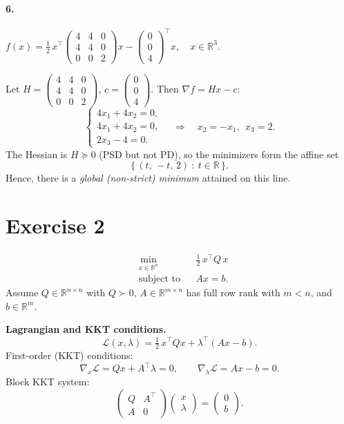 \documentclass{article}
\begin{document}
\paragraph{6.} \(f(x)=\tfrac12\,x^\top\!
\begin{pmatrix}
4&4&0\\
4&4&0\\
0&0&2
\end{pmatrix}x
-\begin{pmatrix}0\\0\\4\end{pmatrix}^{\!\top}\!x,\quad x\in\mathbb{R}^3.\)

Let \(H=\begin{pmatrix}4&4&0\\4&4&0\\0&0&2\end{pmatrix}\), \(c=\begin{pmatrix}0\\0\\4\end{pmatrix}\).
Then \(\nabla f=Hx-c\):
\[
\begin{cases}
4x_1+4x_2=0,\\
4x_1+4x_2=0,\\
2x_3-4=0.
\end{cases}
\quad\Rightarrow\quad x_2=-x_1,\ \ x_3=2.
\]
The Hessian is \(H\succeq 0\) (PSD but not PD), so the minimizers form the affine set
\[
\{\, (t,\,-t,\,2)\ :\ t\in\mathbb{R}\,\}.
\]
Hence, there is a \emph{global (non-strict) minimum} attained on this line.

\section{Exercise 2}

\[
\begin{aligned}
&\min_{x\in\mathbb{R}^n} && \tfrac{1}{2}\, x^\top Q\, x \tag{1}\\[2pt]
&\text{subject to}       && A x = b. \tag{2}
\end{aligned}
\]
Assume \(Q \in \mathbb{R}^{n\times n}\) with \(Q\succ 0\), \(A \in \mathbb{R}^{m\times n}\) has full row rank with \(m<n\), and \(b \in \mathbb{R}^m\).

\medskip
\noindent\textbf{Lagrangian and KKT conditions.}
\[
\mathcal{L}(x,\lambda)=\tfrac12\,x^\top Q x+\lambda^\top(Ax-b).
\]
First-order (KKT) conditions:
\[
\nabla_x\mathcal{L}=Qx+A^\top\lambda=0,\qquad
\nabla_\lambda\mathcal{L}=Ax-b=0.
\]
Block KKT system:
\[
\begin{pmatrix}
Q & A^\top\\
A & 0
\end{pmatrix}
\begin{pmatrix}
x\\ \lambda
\end{pmatrix}
=
\begin{pmatrix}
0\\ b
\end{pmatrix}.
\]
\end{document}
